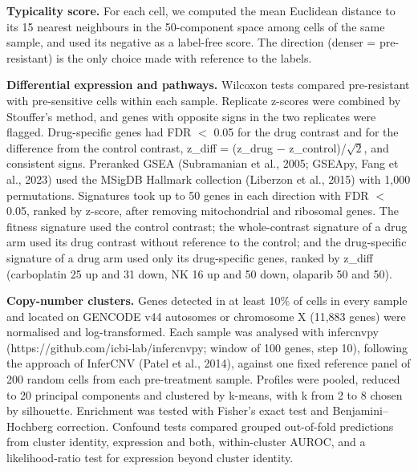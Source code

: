 \documentclass[11pt,a4paper]{article}
\begin{document}
\textbf{Typicality score.} For each cell, we computed the mean Euclidean distance to its 15 nearest neighbours in the 50-component space among cells of the same sample, and used its negative as a label-free score. The direction (denser = pre-resistant) is the only choice made with reference to the labels.

\textbf{Differential expression and pathways.} Wilcoxon tests compared pre-resistant with pre-sensitive cells within each sample. Replicate z-scores were combined by Stouffer's method, and genes with opposite signs in the two replicates were flagged. Drug-specific genes had FDR $<$ 0.05 for the drug contrast and for the difference from the control contrast, z\_diff = (z\_drug $-$ z\_control)/$\sqrt{2}$, and consistent signs. Preranked GSEA (Subramanian et al., 2005; GSEApy, Fang et al., 2023) used the MSigDB Hallmark collection (Liberzon et al., 2015) with 1,000 permutations. Signatures took up to 50 genes in each direction with FDR $<$ 0.05, ranked by z-score, after removing mitochondrial and ribosomal genes. The fitness signature used the control contrast; the whole-contrast signature of a drug arm used its drug contrast without reference to the control; and the drug-specific signature of a drug arm used only its drug-specific genes, ranked by z\_diff (carboplatin 25 up and 31 down, NK 16 up and 50 down, olaparib 50 and 50).

\textbf{Copy-number clusters.} Genes detected in at least 10\% of cells in every sample and located on GENCODE v44 autosomes or chromosome X (11,883 genes) were normalised and log-transformed. Each sample was analysed with infercnvpy (https://github.com/icbi-lab/infercnvpy; window of 100 genes, step 10), following the approach of InferCNV (Patel et al., 2014), against one fixed reference panel of 200 random cells from each pre-treatment sample. Profiles were pooled, reduced to 20 principal components and clustered by k-means, with k from 2 to 8 chosen by silhouette. Enrichment was tested with Fisher's exact test and Benjamini--Hochberg correction. Confound tests compared grouped out-of-fold predictions from cluster identity, expression and both, within-cluster AUROC, and a likelihood-ratio test for expression beyond cluster identity.
\end{document}
